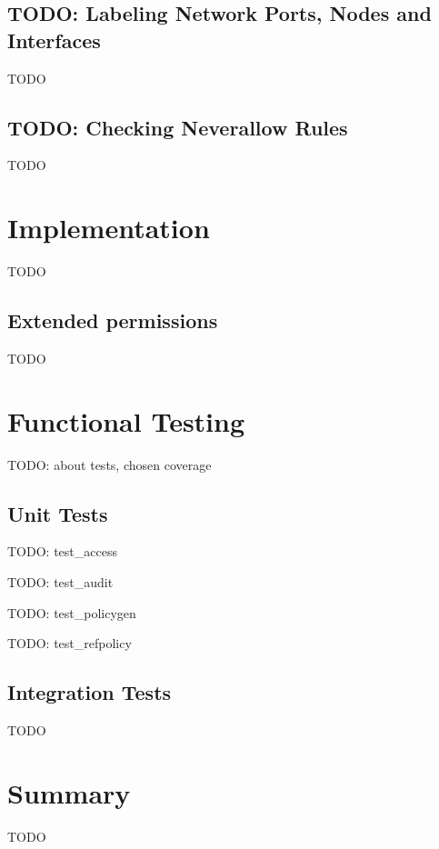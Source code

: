 \section{TODO: Labeling Network Ports, Nodes and Interfaces}
TODO

\section{TODO: Checking Neverallow Rules}
TODO

\chapter{Implementation}
TODO

\section{Extended permissions}
TODO

\chapter{Functional Testing}
TODO: about tests, chosen coverage

\section{Unit Tests}

TODO: test\_access

TODO: test\_audit

TODO: test\_policygen

TODO: test\_refpolicy

\section{Integration Tests}

TODO

\chapter{Summary}
TODO
